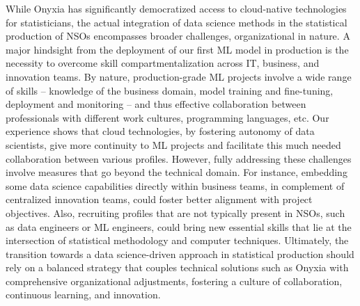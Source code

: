 \documentclass[graybox]{svmult}
\begin{document}
While Onyxia has significantly democratized access to cloud-native technologies for statisticians, the actual integration of data science methods in the statistical production of NSOs encompasses broader challenges, organizational in nature. A major hindsight from the deployment of our first ML model in production is the necessity to overcome skill compartmentalization across IT, business, and innovation teams. By nature, production-grade ML projects involve a wide range of skills -- knowledge of the business domain, model training and fine-tuning, deployment and monitoring -- and thus effective collaboration between professionals with different work cultures, programming languages, etc. Our experience shows that cloud technologies, by fostering autonomy of data scientists, give more continuity to ML projects and facilitate this much needed collaboration between various profiles. However, fully addressing these challenges involve measures that go beyond the technical domain. For instance, embedding some data science capabilities directly within business teams, in complement of centralized innovation teams, could foster better alignment with project objectives. Also, recruiting profiles that are not typically present in NSOs, such as data engineers or ML engineers, could bring new essential skills that lie at the intersection of statistical methodology and computer techniques. Ultimately, the transition towards a data science-driven approach in statistical production should rely on a balanced strategy that couples technical solutions such as Onyxia with comprehensive organizational adjustments, fostering a culture of collaboration, continuous learning, and innovation.



\end{document}

